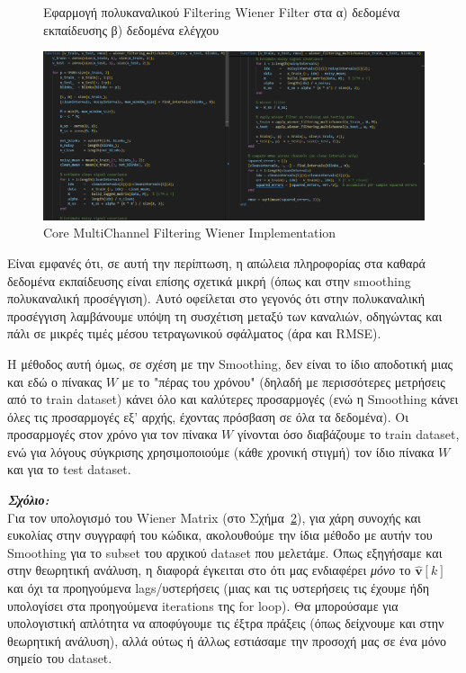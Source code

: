 \documentclass[12pt]{article} %
\begin{document}
\begin{figure}[ht!]
    \caption{Εφαρμογή πολυκαναλικού Filtering Wiener Filter 
    στα α) δεδομένα εκπαίδευσης β) δεδομένα ελέγχου}
    \label{fig:multi_channel_filtering}
\end{figure}

\begin{figure}[ht!]
    \centering
    \includegraphics[width=1.1\linewidth]{plot/code_filt_mutli.png}
    \caption{Core MultiChannel Filtering Wiener Implementation}
    \label{fig:code_filt_mutli}
\end{figure}

Είναι εμφανές ότι, σε αυτή την περίπτωση, 
η απώλεια πληροφορίας στα καθαρά δεδομένα εκπαίδευσης είναι επίσης σχετικά μικρή (όπως και στην smoothing πολυκαναλική προσέγγιση).  
Αυτό οφείλεται στο γεγονός ότι στην πολυκαναλική προσέγγιση λαμβάνουμε υπόψη τη συσχέτιση μεταξύ των καναλιών,  
οδηγώντας και πάλι σε μικρές τιμές μέσου τετραγωνικού σφάλματος (άρα και RMSE).

Η μέθοδος αυτή όμως, σε σχέση με την Smoothing, δεν είναι το ίδιο αποδοτική μιας και εδώ ο πίνακας $W$ με το "πέρας του χρόνου" (δηλαδή με περισσότερες μετρήσεις από το train dataset) κάνει όλο και καλύτερες προσαρμογές (ενώ η Smoothing κάνει όλες τις προσαρμογές εξ' αρχής, έχοντας πρόσβαση σε όλα τα δεδομένα). Οι προσαρμογές στον χρόνο για τον πίνακα $W$ γίνονται όσο διαβάζουμε το train dataset, ενώ για λόγους σύγκρισης χρησιμοποιούμε (κάθε χρονική στιγμή) τον ίδιο πίνακα $W$ και για το test dataset. 

\vspace{+5pt}

\textit{\textbf{Σχόλιο:}} \\
Για τον υπολογισμό του Wiener Matrix (στο Σχήμα~\ref{fig:code_filt_mutli}), για χάρη συνοχής και ευκολίας στην συγγραφή του κώδικα, ακολουθούμε την ίδια μέθοδο με αυτήν του Smoothing για το subset του αρχικού dataset που μελετάμε. Όπως εξηγήσαμε και στην θεωρητική ανάλυση, η διαφορά έγκειται στο ότι μας ενδιαφέρει \textit{μόνο} το $\hat{\mathbf{v}}[k]$ και όχι τα προηγούμενα lags/υστερήσεις (μιας και τις υστερήσεις τις έχουμε ήδη υπολογίσει στα προηγούμενα iterations της for loop). Θα μπορούσαμε για υπολογιστική απλότητα να αποφύγουμε τις έξτρα πράξεις (όπως δείχνουμε και στην θεωρητική ανάλυση), αλλά ούτως ή άλλως εστιάσαμε την προσοχή μας σε ένα μόνο σημείο του dataset.
\end{document}
